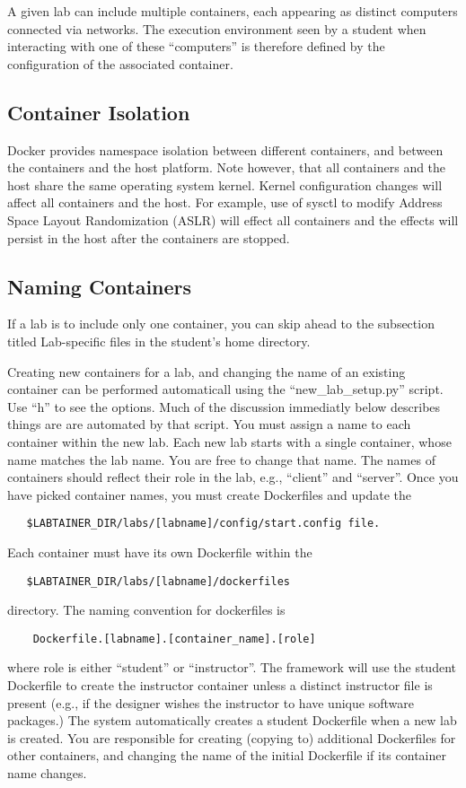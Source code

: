 \documentclass[12pt]{article}
\begin{document}
A given lab can include multiple containers, each appearing as distinct
computers connected via networks.  The execution environment seen by a
student when interacting with one of these ``computers'' is therefore defined
by the configuration of the associated container.  

\subsection {Container Isolation}
Docker provides namespace isolation between different containers, and
between the containers and the host platform.  Note however, that all
containers and the host share the same operating system kernel.  Kernel
configuration changes will affect all containers and the host.  For example,
use of sysctl to modify Address Space Layout Randomization (ASLR) will effect
all containers and the effects will persist in the host after the containers
are stopped.

\subsection {Naming Containers}
If a lab is to include only one container, you can
skip ahead to the subsection titled Lab-specific files in the student's home directory.

Creating new containers for a lab, and changing the name of an existing container
can be performed automaticall using the ``new\_lab\_setup.py'' script.  Use ``h'' to see
the options.  Much of the discussion immediatly below describes things are are
automated by that script.
You must assign a name to each container within the new lab.  Each new lab
starts with a single container, whose name matches the lab name.  You are free
to change that name. The names of containers should reflect their role in the lab,
e.g., ``client'' and ``server''.  Once you have picked container names, you must create
Dockerfiles and update the 
\begin{verbatim}
   $LABTAINER_DIR/labs/[labname]/config/start.config file.

\end{verbatim}
\noindent Each container must have its own Dockerfile within the 
\begin{verbatim}
   $LABTAINER_DIR/labs/[labname]/dockerfiles
\end{verbatim}
\noindent directory.  The naming convention for dockerfiles is
\begin{verbatim}
    Dockerfile.[labname].[container_name].[role]
\end{verbatim}
where role is either ``student'' or ``instructor''.  The framework will use the student Dockerfile to
create the instructor container unless a distinct instructor file is present (e.g., if the designer
wishes the instructor to have unique software packages.) The system automatically creates a student Dockerfile
when a new lab is created.  You are responsible for creating (copying to) additional Dockerfiles for other containers,
and changing the name of the initial Dockerfile if its container name changes.
\end{document}
